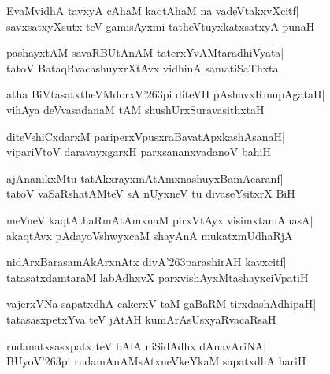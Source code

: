 \documentclass[twoside,12pt,openright]{book}
\def\S{\char'263}
\newcounter{shloka}[chapter]
\begin{document}
\begin{shloka}%
EvaMvidhA tavxyA cAhaM kaqtAhaM na vadeVtakxvXcitf|\\
savxsatxyXsutx teV gamisAyxmi tatheVtuyxkatxsatxyA punaH
\end{shloka}

\begin{shloka}%
pashayxtAM savaRBUtAnAM taterxYvAMtaradhiVyata|\\
tatoV BataqRvacashuyxrXtAvx vidhinA samatiSaThxta
\end{shloka}

\begin{shloka}%
atha BiVtasatxtheVMdorxV\S pi diteVH pAshavxRmupAgataH|\\
vihAya deVvasadanaM tAM shushUrxSuravasithxtaH
\end{shloka}

\begin{shloka}%
diteVshiCxdarxM pariperxVpusxraBavatApxkashAsanaH|\\
vipariVtoV daravayxgarxH parxsananxvadanoV bahiH
\end{shloka}

\begin{shloka}%
ajAnanikxMtu tatAkxrayxmAtAmxnashuyxBamAcaranf|\\
tatoV vaSaRshatAMteV sA nUyxneV tu divaseYsitxrX BiH
\end{shloka}

\begin{shloka}%
meVneV kaqtAthaRmAtAmxnaM pirxVtAyx visimxtamAnasA|\\
akaqtAvx pAdayoVshwyxcaM shayAnA mukatxmUdhaRjA
\end{shloka}

\begin{shloka}%
nidArxBarasamAkArxnAtx divA\S parashirAH kavxcitf|\\
tatasatxdamtaraM labAdhxvX parxvishAyxMtashayxciVpatiH
\end{shloka}

\begin{shloka}%
vajerxVNa sapatxdhA cakerxV taM gaBaRM tirxdashAdhipaH|\\
tatasasxpetxYva teV jAtAH kumArAsUsxyaRvacaRsaH
\end{shloka}

\begin{shloka}%
rudanatxsasxpatx teV bAlA niSidAdhx dAnavAriNA|\\
BUyoV\S pi rudamAnAMsAtxneVkeYkaM sapatxdhA hariH
\end{shloka}
\end{document}
